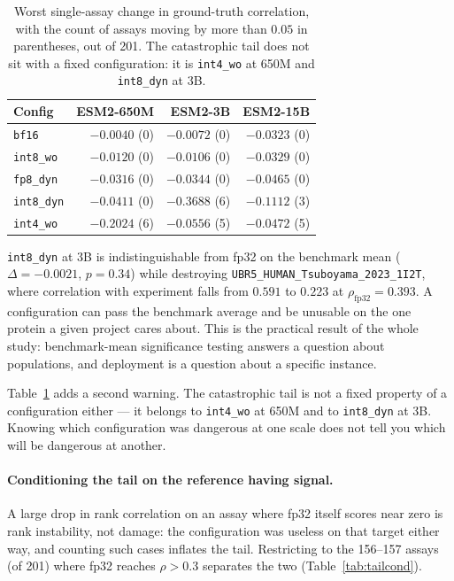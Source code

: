\documentclass[11pt]{article}
\newcommand{\cfg}[1]{\texttt{#1}}
\begin{document}
\begin{table}[htb]
\centering
\caption{Worst single-assay change in ground-truth correlation, with the count
of assays moving by more than $0.05$ in parentheses, out of 201. The
catastrophic tail does not sit with a fixed configuration: it is
\cfg{int4\_wo} at 650M and \cfg{int8\_dyn} at 3B.}
\label{tab:tail3}
\small
\begin{tabular}{lrrr}
\toprule
Config & ESM2-650M & ESM2-3B & ESM2-15B \\
\midrule
\cfg{bf16}      & $-0.0040$ (0) & $-0.0072$ (0) & $-0.0323$ (0) \\
\cfg{int8\_wo}  & $-0.0120$ (0) & $-0.0106$ (0) & $-0.0329$ (0) \\
\cfg{fp8\_dyn}  & $-0.0316$ (0) & $-0.0344$ (0) & $-0.0465$ (0) \\
\cfg{int8\_dyn} & $-0.0411$ (0) & $\mathbf{-0.3688}$ (6) & $-0.1112$ (3) \\
\cfg{int4\_wo}  & $\mathbf{-0.2024}$ (6) & $-0.0556$ (5) & $-0.0472$ (5) \\
\bottomrule
\end{tabular}
\end{table}

\cfg{int8\_dyn} at 3B is indistinguishable from fp32 on the benchmark mean
($\Delta = -0.0021$, $p = 0.34$) while destroying
\texttt{UBR5\_HUMAN\_Tsuboyama\_2023\_1I2T}, where correlation with experiment
falls from $0.591$ to $0.223$ at $\rho_{\text{fp32}} = 0.393$. A configuration
can pass the benchmark average and be unusable on the one protein a given
project cares about. This is the practical result of the whole study:
benchmark-mean significance testing answers a question about populations, and
deployment is a question about a specific instance.

Table~\ref{tab:tail3} adds a second warning. The catastrophic tail is not a
fixed property of a configuration either --- it belongs to \cfg{int4\_wo} at
650M and to \cfg{int8\_dyn} at 3B. Knowing which configuration was dangerous at
one scale does not tell you which will be dangerous at another.

\paragraph{Conditioning the tail on the reference having signal.} A large drop
in rank correlation on an assay where fp32 itself scores near zero is rank
instability, not damage: the configuration was useless on that target either
way, and counting such cases inflates the tail. Restricting to the 156--157
assays (of 201) where fp32 reaches $\rho > 0.3$ separates the two
(Table~\ref{tab:tailcond}).
\end{document}
